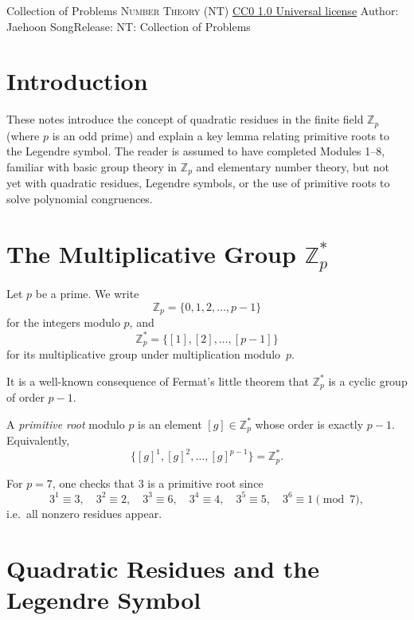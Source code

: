 \handout
{Collection of Problems}
{\textsc{Number Theory (NT)}}
{\href{https://creativecommons.org/publicdomain/zero/1.0/}{CC0 1.0 Universal license}}
{Author: Jaehoon Song}{Release: \generatedOn}
{NT: Collection of Problems}




\section*{Introduction}
These notes introduce the concept of quadratic residues in the finite field $\mathbb{Z}_p$ (where $p$ is an odd prime) and explain a key lemma relating primitive roots to the Legendre symbol.  The reader is assumed to have completed Modules 1--8, familiar with basic group theory in $\mathbb{Z}_p$ and elementary number theory, but not yet with quadratic residues, Legendre symbols, or the use of primitive roots to solve polynomial congruences.

\section{The Multiplicative Group $\mathbb{Z}_p^*$}


\begin{definition}
Let $p$ be a prime.  We write
$$
\mathbb{Z}_p = \{0,1,2,\dots,p-1\}
$$
for the integers modulo $p$, and
$$
\mathbb{Z}_p^* = \{[1],[2],\dots,[p-1]\}
$$
for its multiplicative group under multiplication modulo~$p$.
\end{definition}

It is a well-known consequence of Fermat's little theorem that $\mathbb{Z}_p^*$ is a cyclic group of order $p-1$.

\begin{definition}
A \emph{primitive root} modulo $p$ is an element $[g]\in\mathbb{Z}_p^*$ whose order is exactly $p-1$.  Equivalently,
$$
\{[g]^1,[g]^2,\dots,[g]^{p-1}\} = \mathbb{Z}_p^*.
$$
\end{definition}

\begin{example}
For $p=7$, one checks that $3$ is a primitive root since
$$3^1\equiv3,\quad3^2\equiv2,\quad3^3\equiv6,\quad3^4\equiv4,\quad3^5\equiv5,\quad3^6\equiv1\pmod7,$$
i.e.~all nonzero residues appear.
\end{example}

\section{Quadratic Residues and the Legendre Symbol}

